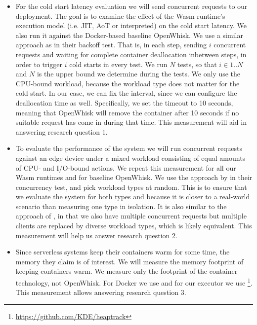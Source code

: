 \begin{itemize}
    \item For the cold start latency evaluation we will send concurrent requests to our deployment. The goal is to examine the effect of the Wasm runtime's execution model (i.e. JIT, AoT or interpreted) on the cold start latency.
    We also run it against the Docker-based baseline OpenWhisk. We use a similar approach as \citeauthor{McGrath2017} in their backoff test. That is, in each step, sending $i$ concurrent requests and waiting for complete container deallocation inbetween steps, in order to trigger $i$ cold starts in every test. We run $N$ tests, so that $i \in {1..N}$ and $N$ is the upper bound we determine during the tests. We only use the CPU-bound workload, because the workload type does not matter for the cold start. 
    In our case, we can fix the interval, since we can configure the deallocation time as well. Specifically, we set the  timeout to 10 seconds, meaning that OpenWhisk will remove the container after 10 seconds if no suitable request has come in during that time. This measurement will aid in answering research question 1.

    \item To evaluate the performance of the system we will run concurrent requests against an edge device under a mixed workload consisting of equal amounts of CPU- and I/O-bound actions. We repeat this measurement for all our Wasm runtimes and for baseline OpenWhisk. We use the approach by \citeauthor{McGrath2017} in their concurrency test, and pick workload types at random. This is to ensure that we evaluate the system for both types and because it is closer to a real-world scenario than measuring one type in isolation. It is also similar to the approach of \citeauthor{Hall2019}, in that we also have multiple concurrent requests but multiple clients are replaced by diverse workload types, which is likely equivalent. This measurement will help us answer research question 2.
    
    \item Since serverless systems keep their containers warm for some time, the memory they claim is of interest. We will measure the memory footprint of keeping containers warm.  We measure only the footprint of the container technology, not OpenWhisk. For Docker we use  and for our executor we use  \footnote{\url{https://github.com/KDE/heaptrack}}. This measurement allows answering research question 3.
\end{itemize}

